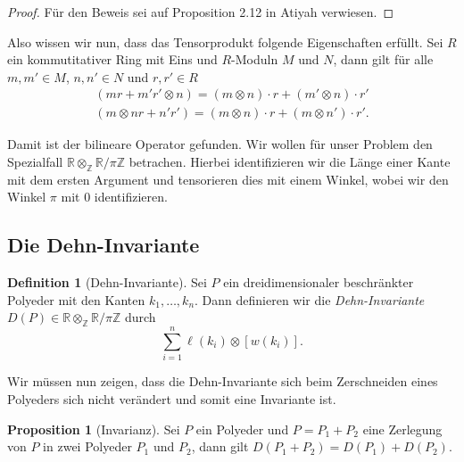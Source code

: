 \documentclass[11pt,titlepage]{article}
\newcommand{\setZ}{\mathbb{Z}}
\newcommand{\setR}{\mathbb{R}}
\theoremstyle{definition}
\newtheorem{proposition}[theorem]{Proposition}
\newtheorem{definition}[theorem]{Definition}
\theoremstyle{remark}
\begin{document}
	\begin{proof}
		Für den Beweis sei auf Proposition 2.12 in Atiyah verwiesen.
	\end{proof}
	
	Also wissen wir nun, dass das Tensorprodukt folgende Eigenschaften erfüllt. Sei $R$ ein kommutitativer Ring 
	mit Eins und $R$-Moduln $M$ und $N$, dann gilt für alle $m,m'\in M$, $n,n'\in N$ und $r,r'\in R$
	\begin{align*}
		(mr+m'r'\otimes n)=(m\otimes n)\cdot r +(m'\otimes n)\cdot r' \\
		(m\otimes nr+n'r')=(m\otimes n)\cdot r+(m\otimes n')\cdot r'.
	\end{align*}
	
	Damit ist der bilineare Operator gefunden. Wir wollen für unser Problem den Spezialfall 
	$\setR \otimes_{\setZ} \setR / \pi\setZ$ betrachen. Hierbei identifizieren wir die Länge einer Kante mit dem 
	ersten Argument und tensorieren dies mit einem Winkel, wobei wir den Winkel $\pi$ mit 0 identifizieren.
	
	\subsection{Die Dehn-Invariante}
	
	\begin{definition}[Dehn-Invariante]
		Sei $P$ ein dreidimensionaler beschränkter Polyeder mit den Kanten $k_1,\ldots,k_n$. Dann definieren wir die 
		\textsl{Dehn-Invariante} $D(P)\in \setR \otimes_{\setZ}\setR/\pi \setZ$ durch
		\[ \sum_{i=1}^n \ell(k_i)\otimes [w(k_i)]. \]
	\end{definition}
	
	Wir müssen nun zeigen, dass die Dehn-Invariante sich beim Zerschneiden eines Polyeders sich nicht 
	verändert und somit eine Invariante ist.
	
	\begin{proposition}[Invarianz] \label{prop:invarianz}
		Sei $P$ ein Polyeder und $P=P_1+P_2$ eine Zerlegung von $P$ in zwei Polyeder $P_1$ und $P_2$, dann 
		gilt $D(P_1+P_2)=D(P_1)+D(P_2)$.	
	\end{proposition}
	
\end{document}
